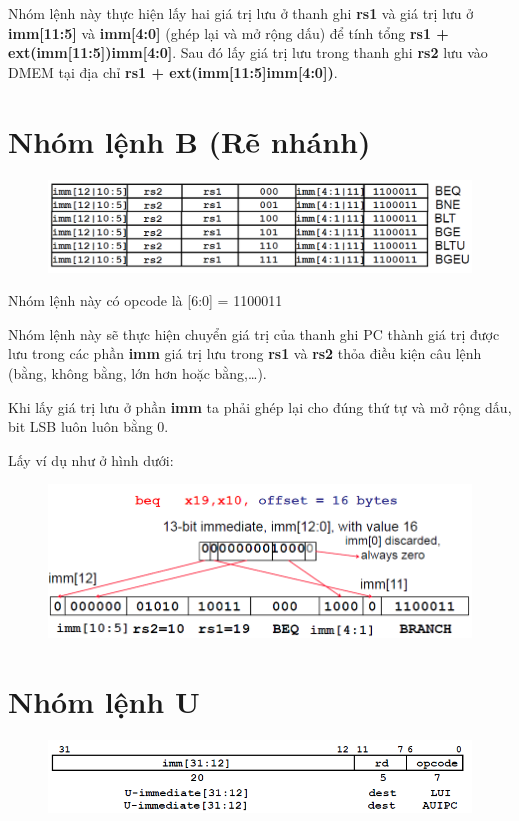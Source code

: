 \documentclass[E:/Latex/ExtraWork/ComputerArchitechture/Report.tex]{subfiles}
\begin{document}
	Nhóm lệnh này thực hiện lấy hai giá trị lưu ở thanh ghi \textbf{rs1} và giá trị lưu ở \textbf{imm[11:5]} và \textbf{imm[4:0]} (ghép lại và mở rộng dấu) để tính tổng \textbf{rs1 + ext(imm[11:5])imm[4:0]}. Sau đó lấy giá trị lưu trong thanh ghi \textbf{rs2} lưu vào DMEM tại địa chỉ \textbf {rs1 + ext(imm[11:5]imm[4:0])}.

\section{Nhóm lệnh B (Rẽ nhánh)}
		\begin{figure}[h!]
			\includegraphics[scale = 0.7]{Figure/Fig7.png}
			\centering
		\end{figure}
	Nhóm lệnh này có opcode là [6:0] = 1100011

	Nhóm lệnh này sẽ thực hiện chuyển giá trị của thanh ghi PC thành giá trị được lưu trong các phần \textbf{imm} giá trị lưu trong \textbf{rs1} và \textbf{rs2} thỏa điều kiện câu lệnh (bằng, không bằng, lớn hơn hoặc bằng,…). 

	Khi lấy giá trị lưu ở phần \textbf{imm} ta phải ghép lại cho đúng thứ tự và mở rộng dấu, bit LSB luôn luôn bằng 0.

	Lấy ví dụ như ở hình dưới:
			\begin{figure}[h!]
				\includegraphics[scale = 0.7]{Figure/Fig8.png}
				\centering
			\end{figure}


\section{Nhóm lệnh U}
			\begin{figure}[h!]
					\includegraphics[scale = 0.7]{Figure/Fig9.png}
					\centering
			\end{figure}
\end{document}

